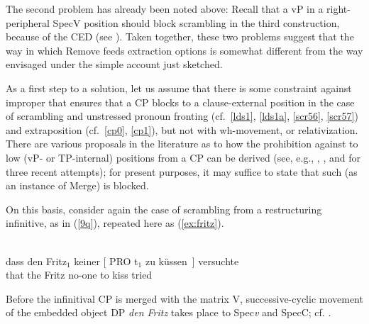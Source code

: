 \documentclass[output=paper]{langsci/langscibook}
\begin{document}
The second problem has already been noted above: Recall that a vP in a
right-peripheral SpecV position should block scrambling in the third
construction, because of the \gls{CED} (see ). Taken together,
these two problems suggest that the way in which Remove feeds extraction
options is somewhat different from the way envisaged under the simple account
just sketched.

As a first step to a solution, let us assume that there is some constraint
against improper  that ensures that a CP blocks  to a
clause-external position in the case of scrambling and unstressed pronoun
fronting (cf.\ \eqref{lds1}, \eqref{lds1a}, \eqref{scr56}, \eqref{scr57}) and
extraposition (cf.\ \eqref{cp0}, \eqref{cp1}), but not with wh-movement,
 or relativization.  There are various proposals in the
literature as to how the prohibition against  to low (vP- or
TP-internal) positions from a CP can be derived (see, e.g.,
\citealt[Ch.~2]{Mueller:14:buf}, \citealt{Wurmbrand:15}, and \citealt{Keine:16}
for three recent attempts); for present purposes, it may suffice to state that
such  (as an instance of Merge) is blocked.

On this basis, consider again the case of scrambling from a restructuring
infinitive, as in (\ref{9q}), repeated here as (\ref{ex:fritz}).

\ea\label{ex:fritz} \\
    \gll dass \label{fdsc4}den Fritz$_1$ keiner [ PRO t$_1$ zu küssen~] versuchte\\
        that the Fritz\textsubscript{\Acc} no-one\textsubscript{\Nom} {} {} {}  to kiss tried\\
\z

Before the infinitival CP is merged with the matrix V, successive-cyclic
movement of the embedded object DP {\itshape den Fritz} takes place to Spec\emph{v}
and SpecC; cf. .
\end{document}
